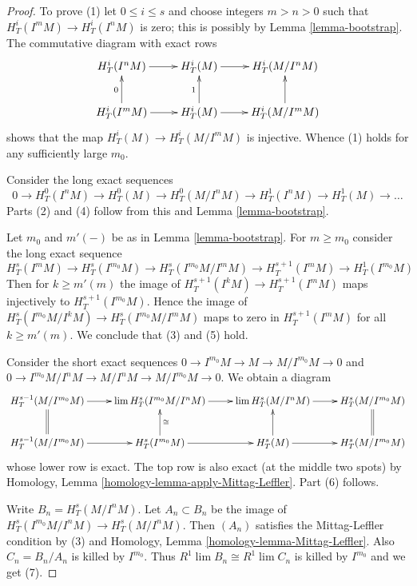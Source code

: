 \begin{proof}
To prove (1) let $0 \leq i \leq s$ and choose integers $m > n > 0$ such that
$H^i_T(I^mM) \to H^i_T(I^nM)$ is zero; this is possibly by
Lemma \ref{lemma-bootstrap}. The commutative diagram with exact rows
$$
\xymatrix{
H^i_T(I^nM) \ar[r] &
H^i_T(M) \ar[r] &
H^i_T(M/I^nM) \\
H^i_T(I^mM) \ar[r] \ar[u]^0 &
H^i_T(M) \ar[r] \ar[u]^1 &
H^i_T(M/I^mM) \ar[u] \\
}
$$
shows that the map $H^i_T(M) \to H^i_T(M/I^mM)$ is injective. Whence (1) holds
for any sufficiently large $m_0$.

\medskip\noindent
Consider the long exact sequences
$$
0 \to H^0_T(I^nM) \to H^0_T(M) \to
H^0_T(M/I^nM) \to H^1_T(I^nM) \to
H^1_T(M) \to \ldots
$$
Parts (2) and (4) follow from this and Lemma \ref{lemma-bootstrap}.

\medskip\noindent
Let $m_0$ and $m'(-)$ be as in Lemma \ref{lemma-bootstrap}.
For $m \geq m_0$ consider the long exact sequence
$$
H^s_T(I^mM) \to H^s_T(I^{m_0}M) \to
H^s_T(I^{m_0}M/I^mM) \to H^{s + 1}_T(I^mM) \to
H^1_T(I^{m_0}M)
$$
Then for $k \geq m'(m)$ the image of
$H^{s + 1}_T(I^kM) \to H^{s + 1}_T(I^mM)$
maps injectively to $H^{s + 1}_T(I^{m_0}M)$.
Hence the image of
$H^s_T(I^{m_0}M/I^kM) \to H^s_T(I^{m_0}M/I^mM)$
maps to zero in $H^{s + 1}_T(I^mM)$ for all $k \geq m'(m)$.
We conclude that (3) and (5) hold.

\medskip\noindent
Consider the short exact sequences
$0 \to I^{m_0}M \to M \to M/I^{m_0} M \to 0$ and
$0 \to I^{m_0}M/I^nM \to M/I^nM \to M/I^{m_0} M \to 0$.
We obtain a diagram
$$
\xymatrix{
H^{s - 1}_T(M/I^{m_0}M) \ar[r] &
\lim H^s_T(I^{m_0}M/I^nM) \ar[r] &
\lim H^s_T(M/I^nM) \ar[r] &
H^s_T(M/I^{m_0}M) \\
H^{s - 1}_T(M/I^{m_0}M) \ar[r] \ar@{=}[u] &
H^s_T(I^{m_0}M) \ar[r] \ar[u]_{\cong} &
H^s_T(M) \ar[r] \ar[u] &
H^s_T(M/I^{m_0}M) \ar@{=}[u]
}
$$
whose lower row is exact. The top row is also exact
(at the middle two spots) by
Homology, Lemma \ref{homology-lemma-apply-Mittag-Leffler}.
Part (6) follows.

\medskip\noindent
Write $B_n = H^s_T(M/I^nM)$. Let $A_n \subset B_n$
be the image of $H^s_T(I^{m_0}M/I^nM) \to H^s_T(M/I^nM)$.
Then $(A_n)$ satisfies the Mittag-Leffler condition by (3) and
Homology, Lemma \ref{homology-lemma-Mittag-Leffler}.
Also $C_n = B_n/A_n$ is killed by $I^{m_0}$. Thus
$R^1\lim B_n \cong R^1\lim C_n$ is killed by $I^{m_0}$ and we get (7).
\end{proof}

